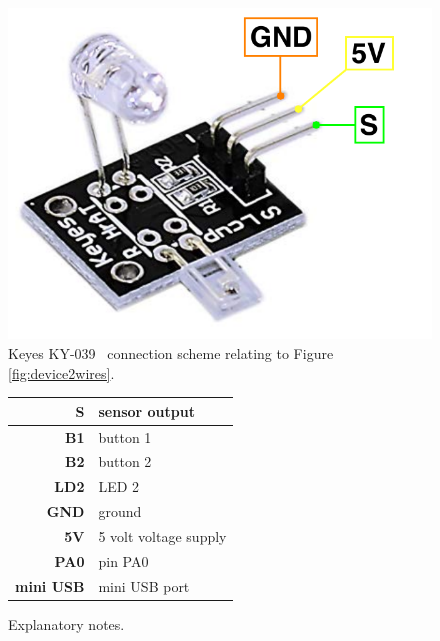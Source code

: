 \documentclass[11pt,a4paper]{article}
\begin{document}
\begin{figure}[H]
    \centering
    \includegraphics[scale=0.5]{img/sensor1-wires.pdf}
    \caption{Keyes KY-039~\cite{IMG-SENSOR-1} connection scheme relating to Figure \ref{fig:device2wires}.}
    \label{fig:senzor2wires}
\end{figure}

\begin{figure}[H]
    \begin{center}
        \begin{tabular}{|r|l|}
            \hline
            \textbf{S}        & sensor output \\
            \hline
            \textbf{B1}       & button 1 \\
            \hline
            \textbf{B2}       & button 2 \\
            \hline
            \textbf{LD2}      & LED 2 \\
            \hline
            \textbf{GND}      & ground \\
            \hline
            \textbf{5V}       & 5 volt voltage supply \\
            \hline
            \textbf{PA0}      & pin PA0 \\
            \hline
            \textbf{mini USB} & mini USB port \\
            \hline
        \end{tabular}
    \end{center}
    \caption{Explanatory notes.}
    \label{fig:legend}
\end{figure}
\end{document}
